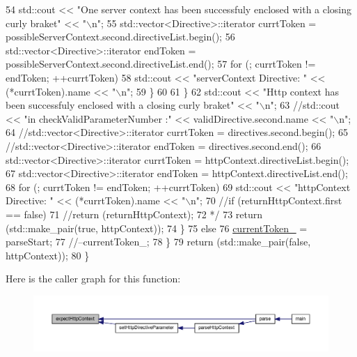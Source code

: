 \begin{DoxyCode}
54 \textcolor{comment}{                        std::cout << "One server context has been successfuly enclosed with a closing curly
       braket" << "\(\backslash\)n";}
55 \textcolor{comment}{                        std::vector<Directive>::iterator    currtToken =
       possibleServerContext.second.directiveList.begin();}
56 \textcolor{comment}{                        std::vector<Directive>::iterator    endToken =
       possibleServerContext.second.directiveList.end();}
57 \textcolor{comment}{                        for (; currtToken != endToken; ++currtToken)}
58 \textcolor{comment}{                            std::cout << "serverContext Directive: " << (*currtToken).name << "\(\backslash\)n";}
59 \textcolor{comment}{                    \}}
60 \textcolor{comment}{}
61 \textcolor{comment}{                \}}
62 \textcolor{comment}{                std::cout << "Http context has been successfuly enclosed with a closing curly braket" <<
       "\(\backslash\)n";}
63 \textcolor{comment}{                //std::cout << "in checkValidParameterNumber :" << validDirective.second.name << "\(\backslash\)n";}
64 \textcolor{comment}{                //std::vector<Directive>::iterator  currtToken = directives.second.begin();}
65 \textcolor{comment}{                //std::vector<Directive>::iterator  endToken = directives.second.end();}
66 \textcolor{comment}{                std::vector<Directive>::iterator    currtToken = httpContext.directiveList.begin();}
67 \textcolor{comment}{                std::vector<Directive>::iterator    endToken = httpContext.directiveList.end();}
68 \textcolor{comment}{                for (; currtToken != endToken; ++currtToken)}
69 \textcolor{comment}{                    std::cout << "httpContext Directive: " << (*currtToken).name << "\(\backslash\)n";}
70 \textcolor{comment}{                //if (returnHttpContext.first == false)}
71 \textcolor{comment}{                //return (returnHttpContext);}
72 \textcolor{comment}{*/}
73                 \textcolor{keywordflow}{return} (std::make\_pair(\textcolor{keyword}{true}, httpContext));
74             \}
75             \textcolor{keywordflow}{else}
76                 \hyperlink{classft_1_1_parser_a942c5b794d108f144c5b5028aaa34cb6}{currentToken\_} = parseStart;
77                 \textcolor{comment}{//--currentToken\_;}
78         \}
79         \textcolor{keywordflow}{return} (std::make\_pair(\textcolor{keyword}{false}, httpContext));
80     \}
\end{DoxyCode}
Here is the caller graph for this function\+:
\nopagebreak
\begin{figure}[H]
\begin{center}
\leavevmode
\includegraphics[width=350pt]{classft_1_1_parser_abcf864a160e3c4e1866edceae06b921b_icgraph}
\end{center}
\end{figure}
